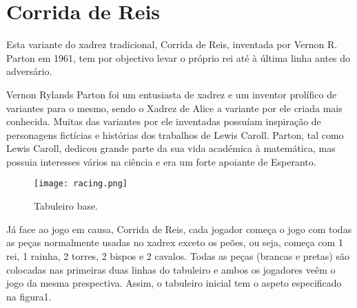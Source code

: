 \documentclass[12pt]{article}
\begin{document}
%
%
%
%
%
%
%



\section{Corrida de Reis}

Esta variante do xadrez tradicional, Corrida de Reis, inventada por Vernon R. Parton em 1961, tem por objectivo levar o próprio rei até à última linha antes do adversário. 

Vernon Rylands Parton foi um entusiasta de xadrez e um inventor prolífico de variantes para o mesmo, sendo o Xadrez de Alice a variante por ele criada mais conhecida. Muitas das variantes por ele inventadas possuíam inspiração de personagens fictícias e histórias dos trabalhos de Lewis Caroll. Parton, tal como Lewis Caroll, dedicou grande parte da sua vida académica à matemática, mas possuia interesses vários na ciência e era um forte apoiante de Esperanto.

\begin{wrapfigure}{R}{0.4\textwidth}
\texttt{[image: racing.png]} 
\caption{Tabuleiro base.}
\label{fig:subim1}
\end{wrapfigure}
Já face ao jogo em causa, Corrida de Reis, cada jogador começa o jogo com todas as peças normalmente usadas no xadrex exceto os peões, ou seja, começa com 1 rei, 1 rainha, 2 torres, 2 bispos e 2 cavalos. Todas as peças (brancas e pretas) são colocadas nas primeiras duas linhas do tabuleiro e ambos os jogadores veêm o jogo da mesma prespectiva. Assim, o tabuleiro inicial tem o aspeto especificado na figura1.
\end{document}
